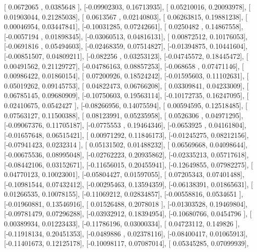 \documentclass{article}
\begin{document}
       [ 0.0672065 ,  0.0385648 ],
       [-0.09902303,  0.16713935],
       [ 0.05210016,  0.20093978],
       [ 0.01903044,  0.21285038],
       [ 0.0613567 ,  0.02140803],
       [ 0.06263815,  0.19881238],
       [ 0.00046954,  0.03447841],
       [-0.10031285,  0.07242661],
       [ 0.0250482 ,  0.14867558],
       [-0.0057194 ,  0.01898345],
       [-0.03060513,  0.04816131],
       [ 0.00872512,  0.10176053],
       [-0.0691816 ,  0.05494603],
       [-0.02468359,  0.07514827],
       [-0.01394875,  0.10441604],
       [-0.00851507,  0.04809211],
       [-0.082256  ,  0.03253123],
       [-0.04745572,  0.18445472],
       [ 0.00491562,  0.21129727],
       [-0.04786163,  0.08857253],
       [-0.068658  ,  0.07471146],
       [ 0.00986422,  0.01860154],
       [ 0.07200926,  0.18524242],
       [-0.01595603,  0.11102631],
       [ 0.05019262,  0.09145753],
       [ 0.04822473,  0.06766208],
       [ 0.03309841,  0.04233009],
       [ 0.06785145,  0.09680909],
       [-0.10750603,  0.19563114],
       [-0.10172735,  0.16247095],
       [ 0.02410675,  0.0542427 ],
       [-0.08266956,  0.14075594],
       [ 0.00594595,  0.12518485],
       [ 0.07563127,  0.11500388],
       [ 0.08123991,  0.05235958],
       [ 0.0526306 ,  0.04971295],
       [-0.09067376,  0.11705187],
       [-0.0775553 ,  0.19464346],
       [-0.0653925 ,  0.04161804],
       [-0.01657648,  0.06515421],
       [ 0.00971292,  0.11846173],
       [-0.01245275,  0.08212156],
       [-0.07941423,  0.0232314 ],
       [ 0.05131502,  0.01488232],
       [ 0.06569668,  0.04098644],
       [-0.00675536,  0.08995048],
       [-0.02762223,  0.20935862],
       [-0.02335213,  0.05717618],
       [-0.08442106,  0.03152671],
       [-0.11656015,  0.20455941],
       [-0.12649855,  0.07982275],
       [ 0.04770123,  0.10023001],
       [-0.05804427,  0.01597055],
       [ 0.07205343,  0.07401488],
       [-0.10981544,  0.07432412],
       [-0.00295463,  0.13594359],
       [-0.06138391,  0.01865631],
       [ 0.01266535,  0.10078155],
       [-0.11069212,  0.02834857],
       [-0.00558816,  0.0534651 ],
       [-0.01960881,  0.13546916],
       [ 0.01526488,  0.2078018 ],
       [-0.01303528,  0.19469804],
       [-0.09781479,  0.07296288],
       [-0.03932912,  0.18394954],
       [-0.10680766,  0.0454796 ],
       [ 0.00389934,  0.01223433],
       [-0.11786196,  0.03000334],
       [ 0.04723112,  0.149826  ],
       [-0.11918134,  0.20451353],
       [-0.0489886 ,  0.02378116],
       [-0.08400417,  0.01065913],
       [-0.11401673,  0.12125178],
       [-0.10098117,  0.07087014],
       [ 0.05345285,  0.07099939],
\end{document}
